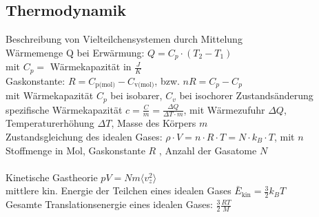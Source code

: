 \documentclass[fs, footer]{latex4ei}
\begin{document}
\begin{multicols*}{4}
\vspace{-8mm}
\section{Thermodynamik}
Beschreibung von Vielteilchensystemen durch Mittelung\\

Wärmemenge Q bei Erwärmung: $Q = C_p\cdot (T_2 - T_1)$\\ mit $C_p =$ Wärmekapazität in $\frac{J}{K}$\\
Gaskonstante: $R = C_{\text{p(mol)}} - C_{\text{v(mol)}}$, bzw. $n R = C_p - C_p$\\ mit Wärmekapazität $C_p$ bei isobarer, $C_v$ bei isochorer Zustandsänderung\\
spezifische Wärmekapazität $c = \frac{C}{m} = \frac{\Delta Q}{\Delta T\cdot m}$, mit Wärmezufuhr $\Delta Q$, Temperaturerhöhung $\Delta T$, Masse des Körpers $m$\\

Zustandsgleichung des idealen Gases: $\rho\cdot V  = n \cdot R\cdot T = N\cdot k_B\cdot T$, mit $n$ Stoffmenge in Mol, Gaskonstante $R$ %
, Anzahl der Gasatome $N$\\%
\\Kinetische Gastheorie $pV = Nm\langle v_z^2 \rangle$\\
mittlere kin. Energie der Teilchen eines idealen Gases $\bar{E}_{\text{kin}} = \frac{3}{2}k_B T$\\ %
Gesamte Translationsenergie eines idealen Gases: $\frac{3}{2}\frac{RT}{M}$\\


\end{multicols*}
\end{document}
